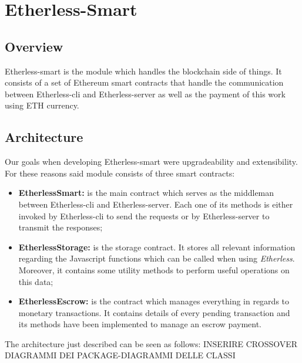 \section{Etherless-Smart}
	
\subsection{Overview}
	Etherless-smart is the module which handles the blockchain side of things. It consists of a set of Ethereum smart contracts that handle the communication between Etherless-cli and Etherless-server as well as the payment of this work using ETH currency.
	
\subsection{Architecture} %
		Our goals when developing Etherless-smart were upgradeability and extensibility. For these reasons said module consists of three smart contracts:
		\begin{itemize}
			\item \textbf{EtherlessSmart:} is the main contract which serves as the middleman between Etherless-cli and Etherless-server. Each one of its methods is either invoked by Etherless-cli to send the requests or by Etherless-server to transmit the responses;
			\item \textbf{EtherlessStorage:} is the storage contract. It stores all relevant information regarding the Javascript functions which can be called when using \textit{Etherless}. Moreover, it contains some utility methods to perform useful operations on this data;
			\item \textbf{EtherlessEscrow:} is the contract which manages everything in regards to monetary transactions. It contains details of every pending transaction and its methods have been implemented to manage an escrow payment.
		\end{itemize}
The architecture just described can be seen as follows: INSERIRE CROSSOVER DIAGRAMMI DEI PACKAGE-DIAGRAMMI DELLE CLASSI
		
